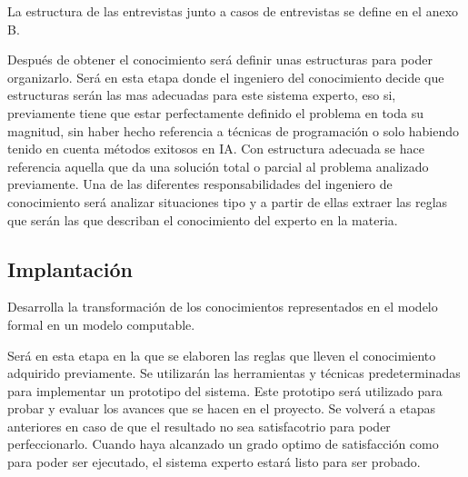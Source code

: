 La estructura de las entrevistas junto a casos de entrevistas se define en el anexo B.

Después de obtener el conocimiento será definir unas estructuras para poder organizarlo.
 Será en esta etapa donde el ingeniero del conocimiento decide que estructuras serán
 las mas adecuadas para este sistema experto, eso si, previamente tiene que estar perfectamente
 definido el problema en toda su magnitud, sin haber hecho referencia a técnicas de programación
 o solo habiendo tenido en cuenta métodos exitosos en IA. Con estructura adecuada se hace referencia
 aquella que da una solución total o parcial al problema analizado previamente. Una de las
 diferentes responsabilidades del ingeniero de conocimiento será analizar situaciones tipo y
 a partir de ellas extraer las reglas que serán las que describan el conocimiento del experto
 en la materia.



\subsection{Implantación}

Desarrolla la transformación de los conocimientos representados en el modelo formal
 en un modelo computable.

Será en esta etapa en la que se elaboren las reglas que lleven el conocimiento adquirido
 previamente. Se utilizarán las herramientas y técnicas predeterminadas para implementar
 un prototipo del sistema. Este prototipo será utilizado para probar y evaluar los avances
 que se hacen en el proyecto. Se volverá a etapas anteriores en caso de que el resultado
 no sea satisfacotrio para poder perfeccionarlo. Cuando haya alcanzado un grado optimo
 de satisfacción como para poder ser ejecutado, el sistema experto estará listo para ser probado.

